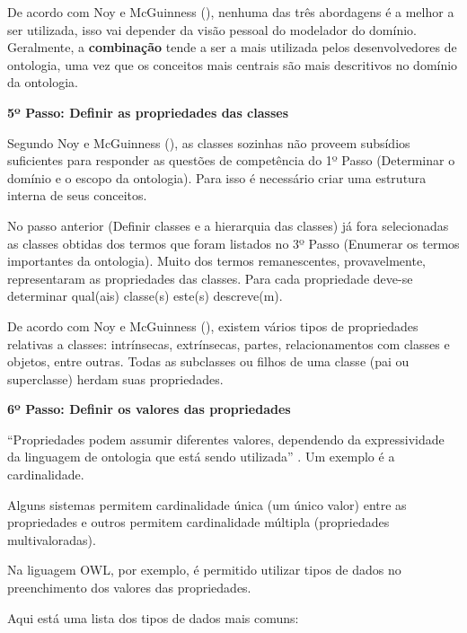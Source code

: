   De acordo com Noy e McGuinness (\citeyear{noy15}), nenhuma das três abordagens é a melhor a ser utilizada, isso vai depender da visão
  pessoal do modelador do domínio. Geralmente, a \textbf{combinação} tende a ser a mais utilizada pelos desenvolvedores de ontologia,
  uma vez que os conceitos mais centrais são mais descritivos no domínio da ontologia. \cite{noy15}
  
\vspace{0.5cm}  
  
{\raggedright  
  \textbf{5º Passo: Definir as propriedades das classes}
}
  
  Segundo Noy e McGuinness (\citeyear{noy15}), as classes sozinhas não proveem subsídios suficientes para responder as questões de competência
  do 1º Passo (Determinar o domínio e o escopo da ontologia). Para isso é necessário criar uma estrutura interna de seus conceitos.
  
  No passo anterior (Definir classes e a hierarquia das classes) já fora selecionadas as classes obtidas dos termos que foram listados
  no 3º Passo (Enumerar os termos importantes da ontologia).  Muito dos termos remanescentes, provavelmente, representaram as
  propriedades das classes. Para cada propriedade deve-se determinar qual(ais) classe(s) este(s) descreve(m). \cite{noy15}
  
  De acordo com Noy e McGuinness (\citeyear{noy15}), existem vários tipos de propriedades relativas a classes: intrínsecas, 
  extrínsecas, partes, relacionamentos com classes e objetos, entre outras. Todas as subclasses ou filhos de uma classe 
  (pai ou superclasse) herdam suas propriedades.
  
\vspace{0.5cm}  
  
{\raggedright
  \textbf{6º Passo: Definir os valores das propriedades}
}
  
  “Propriedades podem assumir diferentes valores, dependendo da expressividade da linguagem de ontologia que está sendo utilizada”
  \cite{breitman05}. Um exemplo é a cardinalidade.
  
  Alguns sistemas permitem cardinalidade única (um único valor) entre as propriedades e outros permitem cardinalidade múltipla 
  (propriedades multivaloradas). \cite{noy15}
  
  Na liguagem OWL, por exemplo, é permitido utilizar tipos de dados no preenchimento dos valores das propriedades. \cite{breitman05}
  
{\raggedright  
  Aqui está uma lista dos tipos de dados mais comuns:
}
  
